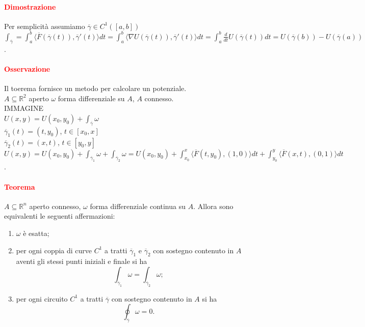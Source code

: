 \documentclass{article}
\newcommand{\R}{\mathbb{R}}
\begin{document}
\paragraph{\textcolor{red}{Dimostrazione}}
Per semplicità assumiamo $\overline{\gamma}\in C^1([a,b])$\\
$\int_{\overline{\gamma}}=\int_a^b \langle \overline{F}(\overline{\gamma}(t)), \overline{\gamma}'(t) \rangle dt = \int_a^b \langle \nabla U(\overline{\gamma}(t)),\overline{\gamma}'(t) \rangle dt = \int_a^b \frac{d}{dt}U(\overline{\gamma}(t))dt=U(\overline{\gamma}(b))-U(\overline{\gamma}(a))$.
\begin{flushright}
    \Lightning
\end{flushright}

\paragraph{\textcolor{red}{Osservazione}}
Il toerema fornisce un metodo per calcolare un potenziale.\\
$A \subseteq \R^2$ aperto $\omega$ forma differenziale su $A$, $A$ connesso.\\
IMMAGINE\\
$U(x,y)=U(x_0,y_0)+\int_{\overline{\gamma}}\omega$\\
$\overline{\gamma}_1(t)=(t,y_0)$, $t \in [x_0,x]$\\
$\overline{\gamma}_2(t)=(x,t)$, $t \in [y_0,y]$\\
$U(x,y)=U(x_0,y_0)+\int_{\overline{\gamma}_1}\omega + \int_{\overline{\gamma}_2}\omega= U(x_0,y_0)+\int_{x_0}^x\langle \overline{F}(t,y_0),(1,0) \rangle dt + \int_{y_0}^y \langle \overline{F}(x,t),(0,1)\rangle dt$.

\paragraph{\textcolor{red}{Teorema}}
$A \subseteq \R^n$ aperto connesso, $\omega$ forma differenziale continua su $A$. Allora sono equivalenti le seguenti affermazioni:
\begin{enumerate}
    \item $\omega$ è esatta;
    \item per ogni coppia di curve $C^1$ a tratti $\overline{\gamma}_1$ e $\overline{\gamma}_2$ con sostegno contenuto in $A$ aventi gli stessi punti iniziali e finale si ha
    \begin{equation*}
        \int_{\overline{\gamma}_1}\omega=\int_{\overline{\gamma}_2}\omega;
    \end{equation*}
    \item per ogni circuito $C^1$ a tratti $\overline{\gamma}$ con sostegno contenuto in $A$ si ha
    \begin{equation*}
        \oint_{\overline{\gamma}}\omega=0.
    \end{equation*}
\end{enumerate}
\end{document}

